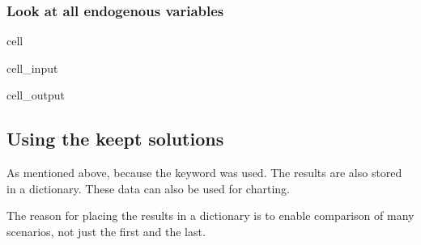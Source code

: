\documentclass[letterpaper,10pt,english]{jupyterBook}
\begin{document}
\subsubsection{Look at all endogenous variables}
\label{\detokenize{content/notebooks/intro/Example Solow:look-at-all-endogenous-variables}}
\begin{sphinxuseclass}{cell}\begin{sphinxVerbatimInput}

\begin{sphinxuseclass}{cell_input}
\begin{sphinxVerbatim}[commandchars=\\\{\}]
\PYG{p}{[}\PYG{p}{]} 
\end{sphinxVerbatim}

\end{sphinxuseclass}\end{sphinxVerbatimInput}
\begin{sphinxVerbatimOutput}

\begin{sphinxuseclass}{cell_output}
\noindent{}

\noindent{}

\end{sphinxuseclass}\end{sphinxVerbatimOutput}

\end{sphinxuseclass}

\subsection{Using the keept solutions}
\label{\detokenize{content/notebooks/intro/Example Solow:using-the-keept-solutions}}
\sphinxAtStartPar
As mentioned above, because the keyword  was used. The results are also stored in a dictionary. These data can
also be used for charting.

\sphinxAtStartPar
The reason for placing the results in a dictionary is to enable comparison of many scenarios, not just the first and the last.
\end{document}
